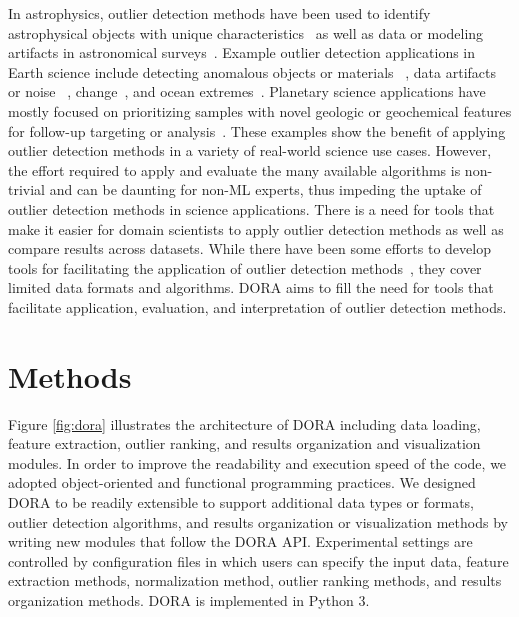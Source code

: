 \documentclass[utf8]{frontiersFPHY} %
\begin{document}
In astrophysics, 
outlier detection methods have been used to identify astrophysical
objects with unique characteristics~\cite{hayat2021self} 
as well as data or modeling 
artifacts in astronomical 
surveys~\citep{wagstaff:des-anom20,lochner2021astronomaly}. 
Example outlier detection applications in 
Earth science include detecting anomalous objects or materials
~\cite{zhou2016novel}, data artifacts or noise 
~\cite{liu2017unsupervised}, change~\cite{touati2020anomaly}, 
and ocean extremes~\cite{prochaska2021deep}. 
Planetary science applications have mostly focused 
on prioritizing samples with novel geologic or geochemical features for
follow-up targeting or analysis~\cite{kerner2020comparison,
wagstaff:demud13}.
%
These examples show the benefit of applying outlier detection methods in
a variety of real-world science use cases. However, the effort required to 
apply and evaluate the many available algorithms is non-trivial and can 
be daunting for non-ML experts, thus impeding the uptake of outlier
detection methods in science applications.  
There is a need for tools that make it easier for domain scientists to apply
outlier detection methods as well as compare results across datasets.
While there have been some efforts to develop tools for facilitating the
application of outlier detection methods~\cite{zhao2019pyod}, they cover
limited data formats and algorithms. DORA aims to fill the need 
for tools that facilitate application, evaluation, and interpretation of outlier
detection methods.


\section{Methods}
Figure \ref{fig:dora} illustrates the architecture of DORA including 
data loading, feature extraction, outlier ranking, and results organization
and visualization modules. 
In order to improve the readability and execution speed of the code, we adopted
object-oriented and functional programming practices.  We designed DORA to be 
readily extensible to support additional data types or formats, outlier detection 
algorithms, and results organization or visualization methods by writing new 
modules that follow the DORA API. Experimental settings are controlled by 
configuration files in which users can specify the input data, 
feature extraction methods, normalization method, outlier ranking methods, and 
results organization methods. 
DORA is implemented in Python 3.
\end{document}
